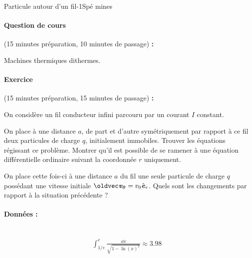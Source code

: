 \begin{exercise}{Particule autour d'un fil}{-1}{Spé}
{}{mines}

\paragraph{Question de cours} \textsf{(15 minutes préparation, 10 minutes de passage) \textbf{:}}

Machines thermiques dithermes.

\paragraph{Exercice} \textsf{(15 minutes préparation, 15 minutes de passage) \textbf{:}}

On considère un fil conducteur infini parcouru par un courant $I$ constant. 

\begin{questions}
\question On place à une distance $a$, de part et d'autre symétriquement par rapport à ce fil deux particules de charge $q$, initialement immobiles. Trouver les équations régissant ce problème. Montrer qu'il est possible de se ramener à une équation différentielle ordinaire suivant la coordonnée $r$ uniquement.

\question On place cette fois-ci à une distance $a$ du fil une seule particule de charge $q$ possédant une vitesse initiale $\vec{v_0}=v_0\ve_r$. Quels sont les changements par rapport à la situation précédente ?
\end{questions}


\paragraph{Données :}~\\
\begin{align*}
    \int_{1/e}^{e} \frac{\dd{x}}{\sqrt{1-\ln(x)^2}} \approx 3.98
\end{align*}

\end{exercise}
